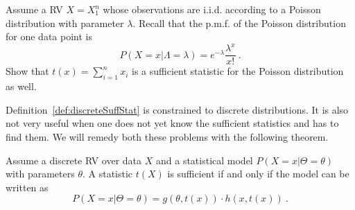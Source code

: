 \begin{Exercise}
Assume a RV $ X=X_{1}^{n} $ whose observations are i.i.d. according to a Poisson distribution
with parameter $ \lambda $. Recall that the p.m.f. of the Poisson distribution for one data point is
$$ P(X=x|\Lambda = \lambda) = e^{-\lambda}\frac{\lambda^{x}}{x!} \ . $$
Show that $t(x) = \sum_{i=1}^n x_i$ is a sufficient statistic for the Poisson distribution as well.
\end{Exercise}

Definition~\ref{def:discreteSuffStat} is constrained to discrete distributions. It is also not very useful
when one does not yet know the sufficient statistics and has to find them. We will remedy both these problems
with the following theorem.
\begin{Theorem}
Assume a discrete RV over data $ X $ and a statistical model $ P(X=x|\Theta=\theta) $ with parameters $ \theta $.
A statistic $ t(X) $ is sufficient if and only if the model can be written as
$$ P(X = x | \Theta = \theta) = g(\theta, t(x)) \cdot h(x, t(x)) \ . $$
\end{Theorem}
